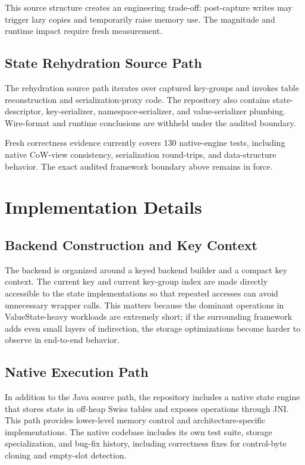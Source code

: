 \documentclass[journal]{IEEEtran}
\begin{document}
This source structure creates an engineering trade-off: post-capture writes may trigger lazy copies and temporarily raise memory use. The magnitude and runtime impact require fresh measurement.

\subsection{State Rehydration Source Path}

The rehydration source path iterates over captured key-groups and invokes table reconstruction and serialization-proxy code. The repository also contains state-descriptor, key-serializer, namespace-serializer, and value-serializer plumbing. Wire-format and runtime conclusions are withheld under the audited boundary.

Fresh correctness evidence currently covers 130 native-engine tests, including native CoW-view consistency, serialization round-trips, and data-structure behavior. The exact audited framework boundary above remains in force.

\section{Implementation Details}

\subsection{Backend Construction and Key Context}

The backend is organized around a keyed backend builder and a compact key context. The current key and current key-group index are made directly accessible to the state implementations so that repeated accesses can avoid unnecessary wrapper calls. This matters because the dominant operations in ValueState-heavy workloads are extremely short; if the surrounding framework adds even small layers of indirection, the storage optimizations become harder to observe in end-to-end behavior.

\subsection{Native Execution Path}

In addition to the Java source path, the repository includes a native state engine that stores state in off-heap Swiss tables and exposes operations through JNI. This path provides lower-level memory control and architecture-specific implementations. The native codebase includes its own test suite, storage specialization, and bug-fix history, including correctness fixes for control-byte cloning and empty-slot detection.
\end{document}
